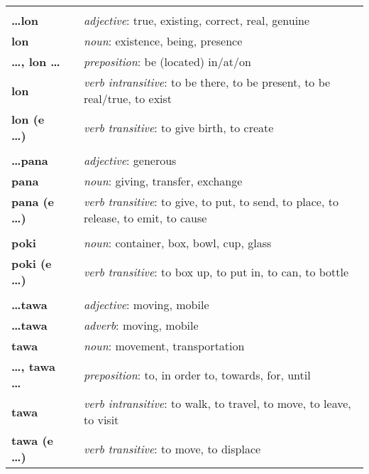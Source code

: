 \begin{supertabular}{p{2,5cm}|ll}
 && \\ %
%
\textbf{\dots lon} && \textit{adjective}: true, existing, correct, real, genuine \\ %
\textbf{lon} && \textit{noun}: existence, being, presence \\ %
\textbf{\dots , lon \dots} && \textit{preposition}: be (located) in/at/on \\ %
\textbf{lon} && \textit{verb intransitive}: to be there, to be present, to be real/true, to exist \\ %
\textbf{lon (e \dots)} && \textit{verb transitive}: to give birth, to create \\ %
 && \\ %
%
\textbf{\dots pana} && \textit{adjective}: generous \\ %
\textbf{pana} && \textit{noun}: giving, transfer, exchange \\ %
\textbf{pana (e \dots)} && \textit{verb transitive}: to give, to put, to send, to place, to release, to emit, to cause \\ %
 && \\ %
%
\textbf{poki} && \textit{noun}: container, box, bowl, cup, glass \\ %
\textbf{poki (e \dots)} && \textit{verb transitive}: to box up, to put in, to can, to bottle \\ %
 && \\ %
%
\textbf{\dots tawa} && \textit{adjective}: moving, mobile \\ %
\textbf{\dots tawa} && \textit{adverb}: moving, mobile \\ %
\textbf{tawa} && \textit{noun}: movement, transportation \\ %
\textbf{\dots , tawa \dots} && \textit{preposition}: to, in order to, towards, for, until \\ %
\textbf{tawa} && \textit{verb intransitive}: to walk, to travel, to move, to leave, to visit \\ %
\textbf{tawa (e \dots)} && \textit{verb transitive}: to move, to displace \\ %
\end{supertabular} \\
%
\newpage{}
%
